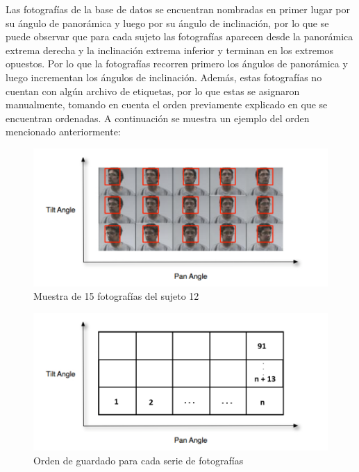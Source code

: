 Las fotografías de la base de datos se encuentran nombradas en primer lugar por su ángulo de panorámica y luego por su ángulo de inclinación, por lo que se puede observar que para cada sujeto las fotografías aparecen desde la panorámica extrema derecha y la inclinación extrema inferior y terminan en los extremos opuestos. Por lo que la fotografías recorren primero los ángulos de panorámica y luego incrementan los ángulos de inclinación. Además, estas fotografías no cuentan con algún archivo de etiquetas, por lo que estas se asignaron manualmente, tomando en cuenta el orden previamente explicado en que se encuentran ordenadas. A continuación se muestra un ejemplo del orden mencionado anteriormente:

\begin{figure}[H]
	\centering
	\includegraphics[scale=1]{figures/tiltpan.png}
	\caption{Muestra de 15 fotografías del sujeto 12 \cite{Gourier_Hall_Crowley}}
	\label{fig:img1}
\end{figure}

\begin{figure}[H]
	\centering
	\includegraphics[scale=1]{figures/faceorder.png}
	\caption{Orden de guardado para cada serie de fotografías}
	\label{fig:img2}
\end{figure}

